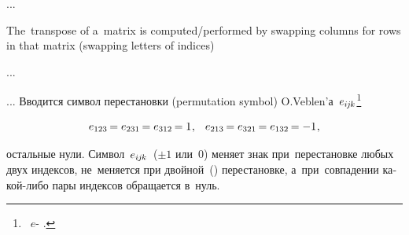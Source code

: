 ...

The~transpose of a~matrix is computed/performed by swapping columns for rows in that matrix (swapping letters of indices)

...

\begin{otherlanguage}{russian}

... Вводится символ перестановки (permutation symbol) \hbox{O.\hspace{.1ex}Veblen’а}~${e_{i\hspace{-0.1ex}j\hspace{-0.1ex}k}}$\footnote{%
 ~$e$\hbox{\hspace{.16ex}-\hspace{.16ex}}  .}

\nopagebreak\vspace{-0.3em}\begin{equation*}
e_{123} \hspace{-0.2ex} = e_{231} \hspace{-0.2ex} = e_{312} \hspace{-0.2ex} = 1
\hspace{.1ex} ,
\hspace{1.8ex}
e_{213} \hspace{-0.2ex} = e_{321} \hspace{-0.2ex} = e_{132} \hspace{-0.2ex} = -1
\hspace{.1ex} ,
\vspace{-0.25em}\end{equation*}

\nopagebreak\noindent
остальные нули.
Символ~${e_{i\hspace{-0.1ex}j\hspace{-0.1ex}k}}$~(${\pm 1}$ или~$0$) меняет знак при~перестановке любых двух индексов, не~меняется при двойной~() перестановке, а~при~совпадении какой\hbox{-}либо пары индексов обращается в~нуль.

\vspace{1mm}

\begin{tcolorbox}[enhanced, colback = green!16, before upper={\parindent2ex}, parbox = false]
\small%
\setlength{\abovedisplayskip}{2pt}\setlength{\belowdisplayskip}{2pt}%


\end{tcolorbox}
\end{otherlanguage}
